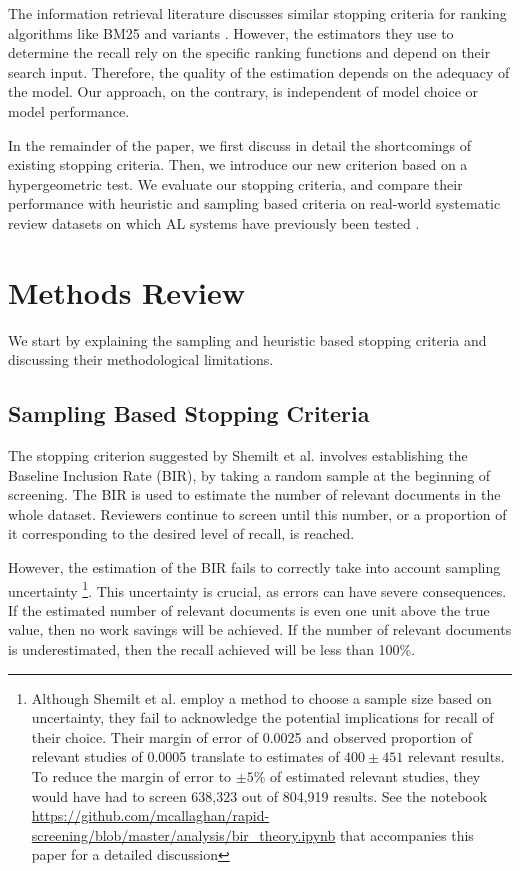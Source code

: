 \documentclass{bmcart}
\begin{document}
	The information retrieval literature discusses similar stopping criteria for ranking algorithms like BM25 and variants \cite{DiNunzio2018, Yu2019}. However, the estimators they use to determine the recall rely on the specific ranking functions and depend on their search input. Therefore, the quality of the estimation depends on the adequacy of the model. Our approach, on the contrary, is independent of model choice or model performance. 
	
	In the remainder of the paper, we first discuss in detail the shortcomings of existing stopping criteria. Then, we introduce our new criterion based on a hypergeometric test. We evaluate our stopping criteria, and compare their performance with heuristic and sampling based criteria on real-world systematic review datasets on which AL systems have previously been tested \cite{Cohen2006, Yu2019, Terasawa2009, Castaldi2009}.
	
	\section*{Methods Review}


	We start by explaining the sampling and heuristic based stopping criteria and discussing their methodological limitations. 
	
	\subsection*{Sampling Based Stopping Criteria}
	
	The stopping criterion suggested by Shemilt et al. \cite{Shemilt2014} involves establishing the Baseline Inclusion Rate (BIR), by taking a random sample at the beginning of screening. 
	The BIR is used to estimate the number of relevant documents in the whole dataset. 
	Reviewers continue to screen until this number, or a proportion of it corresponding to the desired level of recall, is reached.
	
	
	However, the estimation of the BIR fails to correctly take into account sampling uncertainty \footnote{Although Shemilt et al. \cite{Shemilt2014} employ a method  to choose a sample size based on uncertainty, they fail to acknowledge the potential implications for recall of their choice. Their margin of error of 0.0025 and observed proportion of relevant studies of 0.0005 translate to estimates of $400 \pm 451$ relevant results. To reduce the margin of error to $\pm 5\%$ of estimated relevant studies, they would have had to screen 638,323 out of 804,919 results. See the notebook \url{https://github.com/mcallaghan/rapid-screening/blob/master/analysis/bir_theory.ipynb} that accompanies this paper for a detailed discussion}. 
	This uncertainty is crucial, as errors can have severe consequences. If the estimated number of relevant documents is even one unit above the true value, then no work savings will be achieved. If the number of relevant documents is underestimated, then the recall achieved will be less than 100\%.
	
\end{document}
